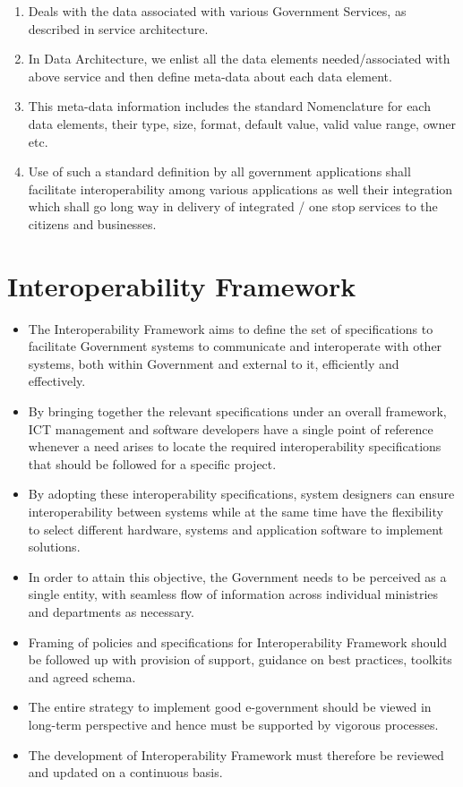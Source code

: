  \begin{enumerate}[label=(\roman*)]
 	\item Deals with the data associated with various Government Services, as described in service architecture. 
 	\item In Data Architecture, we enlist all the data elements needed/associated with above service and then define meta-data about each data element.
 	\item This meta-data information includes the standard Nomenclature for each data elements, their type, size, format, default value, valid value range, owner etc. 
 	\item Use of such a standard definition by all government applications shall facilitate interoperability among various applications as well their integration which shall go long way in delivery of integrated / one stop services to the citizens and businesses.
 \end{enumerate}


\section{Interoperability Framework}
\begin{itemize}
	\item The Interoperability Framework aims to define the set of specifications to facilitate Government systems to communicate and interoperate with other systems, both within Government and external to it, efficiently and effectively.
	\item By bringing together the relevant specifications under an overall framework, ICT management and software developers have a single point of reference whenever a need arises to locate the required interoperability specifications that should be followed for a specific project. 
	\item By adopting these interoperability specifications, system designers can ensure interoperability between systems while at the same time have the flexibility to select different hardware, systems and application software to implement solutions.
	\item In order to attain this objective, the Government needs to be perceived as a single entity, with seamless flow of information across individual ministries and departments as necessary.
	\item Framing of policies and specifications for Interoperability Framework should be followed up with provision of support, guidance on best practices, toolkits and agreed schema. 
	\item The entire strategy to implement good e-government should be viewed in long-term perspective and hence must be supported by vigorous processes. 
	\item The development of Interoperability Framework must therefore be reviewed and updated on a continuous basis.
\end{itemize}

